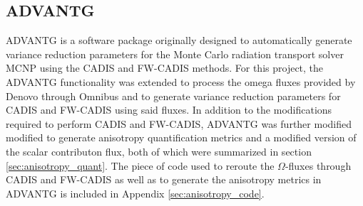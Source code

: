 \subsection{ADVANTG}
\label{sec:advantg}

ADVANTG \cite{mosher_new_2010} is a software package
originally designed to automatically
generate variance reduction
parameters for the Monte Carlo radiation transport solver
MCNP \cite{brown_mcnp_2002}
using the CADIS
and FW-CADIS methods. For this project, the ADVANTG functionality was extended to
process the omega fluxes provided by Denovo through Omnibus and to generate
variance reduction
parameters for CADIS and FW-CADIS using said fluxes. In addition to the
modifications required to perform CADIS and FW-CADIS, ADVANTG was further modified
modified to generate anisotropy quantification metrics and a modified version of
the scalar contributon flux, both of which were summarized in
section \ref{sec:anisotropy_quant}. The piece of code used to
reroute the $\Omega$-fluxes
through CADIS and FW-CADIS as well as to generate the anisotropy metrics in
ADVANTG is included in Appendix \ref{sec:anisotropy_code}.
